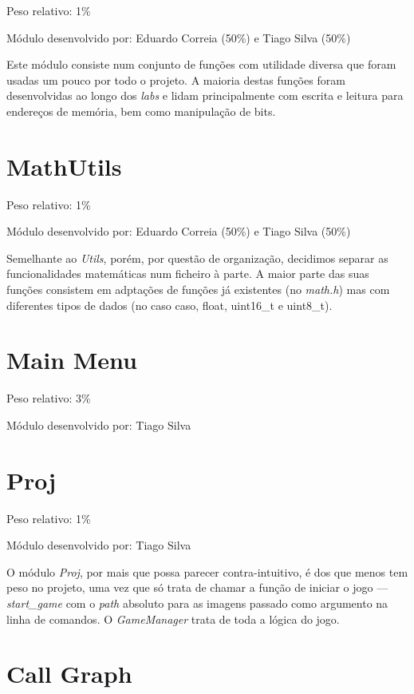 \documentclass{report}
\begin{document}
Peso relativo: 1\%

Módulo desenvolvido por: Eduardo Correia (50\%) e Tiago Silva (50\%) 
\newline

Este módulo consiste num conjunto de funções com utilidade diversa que foram usadas um pouco por todo o projeto. A maioria destas funções foram desenvolvidas ao longo dos \textit{labs} e lidam principalmente com escrita e leitura para endereços de memória, bem como manipulação de bits.

\section{MathUtils}

Peso relativo: 1\%

Módulo desenvolvido por: Eduardo Correia (50\%) e Tiago Silva (50\%)
\newline

Semelhante ao \textit{Utils}, porém, por questão de organização, decidimos separar as funcionalidades matemáticas num ficheiro à parte. A maior parte das suas funções consistem em adptações de funções já existentes (no \textit{math.h}) mas com diferentes tipos de dados (no caso caso, float, uint16\_t e uint8\_t).

\section{Main Menu}

Peso relativo: 3\%

Módulo desenvolvido por: Tiago Silva

\section{Proj}

Peso relativo: 1\%

Módulo desenvolvido por: Tiago Silva

O módulo \textit{Proj}, por mais que possa parecer contra-intuitivo, é dos que menos tem peso no projeto, uma vez que só trata de chamar a função de iniciar o jogo --- \textit{start\_game} com o \textit{path} absoluto para as imagens passado como argumento na linha de comandos. O \textit{GameManager} trata de toda a lógica do jogo.

\section{Call Graph}
\end{document}

